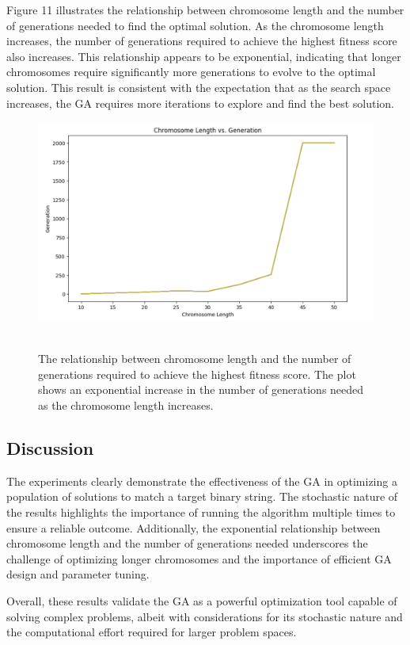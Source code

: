 \documentclass[12pt]{article}
\begin{document}
Figure 11 illustrates the relationship between chromosome length and the number of generations needed to find the optimal solution. As the chromosome length increases, the number of generations required to achieve the highest fitness score also increases. This relationship appears to be exponential, indicating that longer chromosomes require significantly more generations to evolve to the optimal solution. This result is consistent with the expectation that as the search space increases, the GA requires more iterations to explore and find the best solution.

\begin{figure}[H]
\centering
\includegraphics[scale=0.60]{chr_len}\
\caption{The relationship between chromosome length and the number of generations required to achieve the highest fitness score. The plot shows an exponential increase in the number of generations needed as the chromosome length increases.}
\end{figure}

\subsection{Discussion}

The experiments clearly demonstrate the effectiveness of the GA in optimizing a population of solutions to match a target binary string. The stochastic nature of the results highlights the importance of running the algorithm multiple times to ensure a reliable outcome. Additionally, the exponential relationship between chromosome length and the number of generations needed underscores the challenge of optimizing longer chromosomes and the importance of efficient GA design and parameter tuning.

Overall, these results validate the GA as a powerful optimization tool capable of solving complex problems, albeit with considerations for its stochastic nature and the computational effort required for larger problem spaces.
\end{document}
